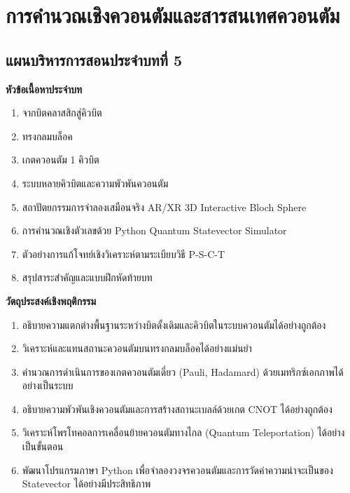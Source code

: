 \chapter{การคำนวณเชิงควอนตัมและสารสนเทศควอนตัม}
\label{chap:quantum_computing}

\section*{แผนบริหารการสอนประจำบทที่ 5}


\begin{lessonplanbox}
\noindent\textbf{หัวข้อเนื้อหาประจำบท}
\begin{enumerate}
    \item จากบิตคลาสสิกสู่คิวบิต
    \item ทรงกลมบล็อค
    \item เกตควอนตัม 1 คิวบิต
    \item ระบบหลายคิวบิตและความพัวพันควอนตัม
    \item สถาปัตยกรรมการจำลองเสมือนจริง AR/XR 3D Interactive Bloch Sphere
    \item การคำนวณเชิงตัวเลขด้วย Python Quantum Statevector Simulator
    \item ตัวอย่างการแก้โจทย์เชิงวิเคราะห์ตามระเบียบวิธี P-S-C-T
    \item สรุปสาระสำคัญและแบบฝึกหัดท้ายบท
\end{enumerate}

\noindent\textbf{วัตถุประสงค์เชิงพฤติกรรม}
\begin{enumerate}
    \item อธิบายความแตกต่างพื้นฐานระหว่างบิตดั้งเดิมและคิวบิตในระบบควอนตัมได้อย่างถูกต้อง
    \item วิเคราะห์และแทนสถานะควอนตัมบนทรงกลมบล็อคได้อย่างแม่นยำ
    \item คำนวณการดำเนินการของเกตควอนตัมเดี่ยว (Pauli, Hadamard) ด้วยเมทริกซ์เอกภาพได้อย่างเป็นระบบ
    \item อธิบายความพัวพันเชิงควอนตัมและการสร้างสถานะเบลล์ด้วยเกต CNOT ได้อย่างถูกต้อง
    \item วิเคราะห์โพรโทคอลการเคลื่อนย้ายควอนตัมทางไกล (Quantum Teleportation) ได้อย่างเป็นขั้นตอน
    \item พัฒนาโปรแกรมภาษา Python เพื่อจำลองวงจรควอนตัมและการวัดค่าความน่าจะเป็นของ Statevector ได้อย่างมีประสิทธิภาพ
\end{enumerate}


\end{lessonplanbox}
